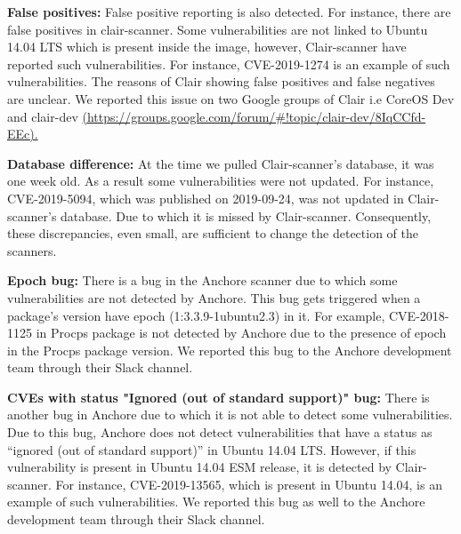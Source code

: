 \documentclass[a4paper,num-refs]{oup-contemporary}
\begin{document}
\textbf{False positives:} False positive reporting is also detected. For instance,
there are false positives in clair-scanner.
Some vulnerabilities are not linked to Ubuntu 14.04 LTS which is 
present inside the image, however, Clair-scanner have reported such vulnerabilities.
For instance, CVE-2019-1274 is an example of such vulnerabilities. 
The reasons of Clair showing
false positives and false negatives are unclear. We reported this issue on two Google groups of Clair i.e CoreOS Dev and
clair-dev \href{https://groups.google.com/forum/\#!topic/clair-dev/8IqCCfd-EEc}{(https://groups.google.com/forum/\#!topic/clair-dev/8IqCCfd-EEc).}

\textbf{Database difference:} At the time we pulled Clair-scanner's database, it was one week old.
                              As a result some vulnerabilities were not updated. For instance, CVE-2019-5094, which
		              was published on 2019-09-24, was not 
		              updated in Clair-scanner's database. Due to which it is missed by Clair-scanner.
			      Consequently, these discrepancies, even small, are sufficient to change the detection of
			      the scanners.

\textbf{Epoch bug:} There is a bug in the Anchore scanner due to which some vulnerabilities are 
		not detected by Anchore. This bug gets triggered when a package’s version have epoch 
		(1:3.3.9-1ubuntu2.3) in it. For example, CVE-2018-1125 in Procps package is not
		detected by Anchore due to the presence of epoch in the Procps package version.
		We reported this bug to the Anchore development team through their Slack channel.

\textbf{CVEs with status "Ignored (out of standard support)" bug:} There is another bug in Anchore due to 
		which it is not able to detect some vulnerabilities. Due to this bug, Anchore does not detect 
		vulnerabilities that have a status as “ignored (out of standard support)” in Ubuntu 14.04 LTS. 
		However, if this vulnerability is present in Ubuntu 14.04 ESM release, it is detected by Clair-scanner. 
		For instance, CVE-2019-13565, which is present in Ubuntu 14.04, is an example of such vulnerabilities. 
		We reported this bug as well to the Anchore development team through their Slack
		channel.
\end{document}
